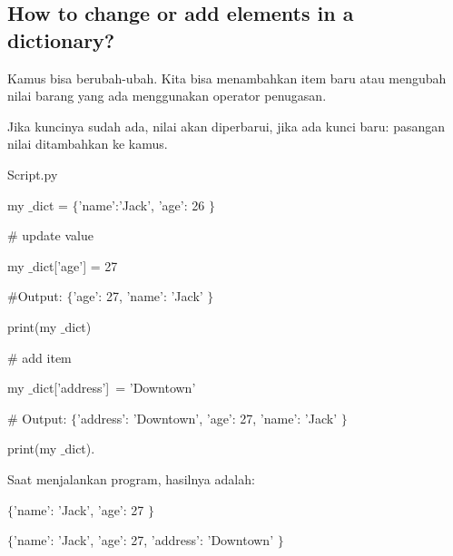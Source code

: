\documentclass[a4paper,12pt]{report}
\begin{document}
\subsection*{How to change or add elements in a dictionary?}
 \par
\noindent 
Kamus bisa berubah-ubah. Kita bisa menambahkan item baru atau mengubah nilai barang yang ada menggunakan operator penugasan. \par
\noindent 
Jika kuncinya sudah ada, nilai akan diperbarui, jika ada kunci baru: pasangan nilai ditambahkan ke kamus. \par
\noindent 
Script.py \par
\noindent 
 \hspace*{0.5in} my $  \_  $dict =  $  \{  $'name':'Jack', 'age': 26 $  \}  $ \par
\vspace{12pt}
\noindent 
 \hspace*{0.5in}  $  \#  $ update value \par
\noindent 
 \hspace*{0.5in} my $  \_  $dict['age'] = 27 \par
\vspace{12pt}
\noindent 
 \hspace*{0.5in}  $  \#  $Output:  $  \{  $'age': 27, 'name': 'Jack' $  \}  $ \par
\noindent 
 \hspace*{0.5in} print(my $  \_  $dict) \par
\vspace{12pt}
\noindent 
 \hspace*{0.5in}  $  \#  $ add item \par
\noindent 
 \hspace*{0.5in} my $  \_  $dict['address']~= 'Downtown'   \par
\vspace{12pt}
\noindent 
 \hspace*{0.5in}  $  \#  $ Output:  $  \{  $'address': 'Downtown', 'age': 27, 'name': 'Jack' $  \}  $ \par
\noindent 
 \hspace*{0.5in} print(my $  \_  $dict). \par
\vspace{12pt}
\noindent 
Saat menjalankan program, hasilnya adalah: \par
\noindent 
{\fontsize{11pt}{11pt}\selectfont  $  \{  $'name': 'Jack', 'age': 27 $  \}  $} \par
\noindent 
{\fontsize{11pt}{11pt}\selectfont  $  \{  $'name': 'Jack', 'age': 27, 'address': 'Downtown' $  \}  $} \par
\vspace{12pt}
\noindent 
\end{document}
